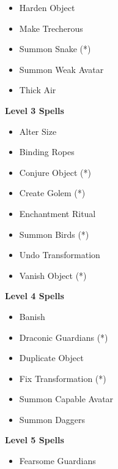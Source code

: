 \begin{multicols}{4}
{\begin{itemize}[itemsep=0em]
\item Harden Object

\item Make Trecherous

\item Summon Snake (*) 

\item Summon Weak Avatar

\item Thick Air


\end{itemize}
\textbf{Level 3 Spells}
\begin{itemize}[itemsep=0em]
\renewcommand\labelitemi{-}
\item Alter Size

\item Binding Ropes

\item Conjure Object (*) 

\item Create Golem (*) 

\item Enchantment Ritual

\item Summon Birds (*) 

\item Undo Transformation

\item Vanish Object (*) 


\end{itemize}
\textbf{Level 4 Spells}
\begin{itemize}[itemsep=0em]
\renewcommand\labelitemi{-}
\item Banish

\item Draconic Guardians (*) 

\item Duplicate Object

\item Fix Transformation (*) 

\item Summon Capable Avatar

\item Summon Daggers


\end{itemize}
\textbf{Level 5 Spells}
\begin{itemize}[itemsep=0em]
\renewcommand\labelitemi{-}
\item Fearsome Guardians


\end{itemize}}
\end{multicols}
